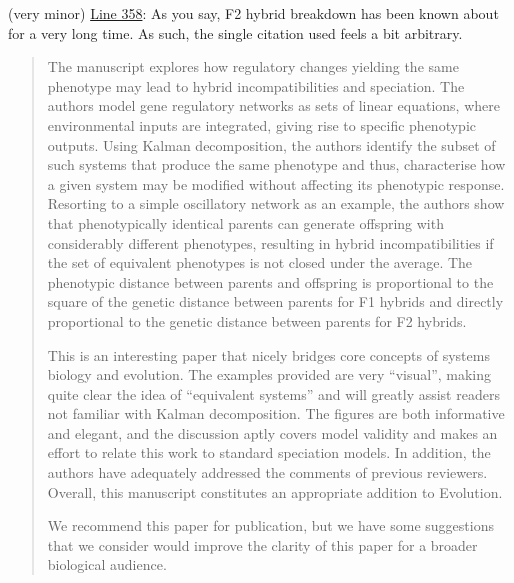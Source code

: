 
\begin{point}{}
  (very minor) \hyperlink{rev1:6}{Line 358}: As you say, F2 hybrid breakdown has been known about for a very long time. As such, the single citation used feels a bit arbitrary.
\end{point}


\begin{quote}
The manuscript explores how regulatory changes yielding the same phenotype may lead to hybrid incompatibilities and speciation. The authors model gene regulatory networks as sets of linear equations, where environmental inputs are integrated, giving rise to specific phenotypic outputs. Using Kalman decomposition, the authors identify the subset of such systems that produce the same phenotype and thus, characterise how a given system may be modified without affecting its phenotypic response. Resorting to a simple oscillatory network as an example, the authors show that phenotypically identical parents can generate offspring with considerably different phenotypes, resulting in hybrid incompatibilities if the set of equivalent phenotypes is not closed under the average. The phenotypic distance between parents and offspring is proportional to the square of the genetic distance between parents for F1 hybrids and directly proportional to the genetic distance between parents for F2 hybrids.

This is an interesting paper that nicely bridges core concepts of systems biology and evolution. The examples provided are very ``visual'', making quite clear the idea of ``equivalent systems'' and will greatly assist readers not familiar with Kalman decomposition. The figures are both informative and elegant, and the discussion aptly covers model validity and makes an effort to relate this work to standard speciation models. In addition, the authors have adequately addressed the comments of previous reviewers. Overall, this manuscript constitutes an appropriate addition to Evolution.

We recommend this paper for publication, but we have some suggestions that we consider would improve the clarity of this paper for a broader biological audience.
\end{quote}

